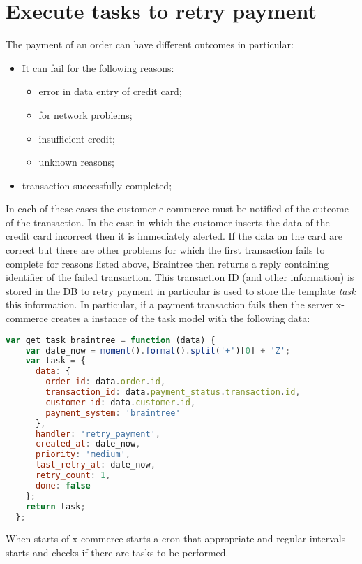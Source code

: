 \section{Execute tasks to retry payment}
\label{sec:tasks_to_retry_payment}
The payment of an order can have different outcomes in particular:
\begin{itemize}
\item It can fail for the following reasons:
\begin{itemize}
\item error in data entry of credit card;
\item for network problems;
\item insufficient credit;
\item unknown reasons;
\end{itemize}
\item transaction successfully completed;
\end{itemize}
In each of these cases the customer e-commerce must be notified of the outcome of the transaction.
\newline
In the case in which the customer inserts the data of the credit card incorrect then it is immediately alerted.
\newline
If the data on the card are correct but there are other problems for which the first transaction fails to complete for reasons listed above, Braintree then returns a reply containing identifier of the failed transaction.
\newline
This transaction ID (and other information) is stored in the DB to retry payment in particular is used to store the template \emph{task} this information.
In particular, if a payment transaction fails then the server x-commerce creates a instance of the task model with the following data:
\begin{lstlisting}[language=javascript]
  var get_task_braintree = function (data) {
    var date_now = moment().format().split('+')[0] + 'Z';
    var task = {
      data: {
        order_id: data.order.id,
        transaction_id: data.payment_status.transaction.id,
        customer_id: data.customer.id,
        payment_system: 'braintree'
      },
      handler: 'retry_payment',
      created_at: date_now,
      priority: 'medium',
      last_retry_at: date_now,
      retry_count: 1,
      done: false
    };
    return task;
  };
\end{lstlisting}
When starts of x-commerce starts a cron that appropriate and regular intervals starts and checks if there are tasks to be performed.
